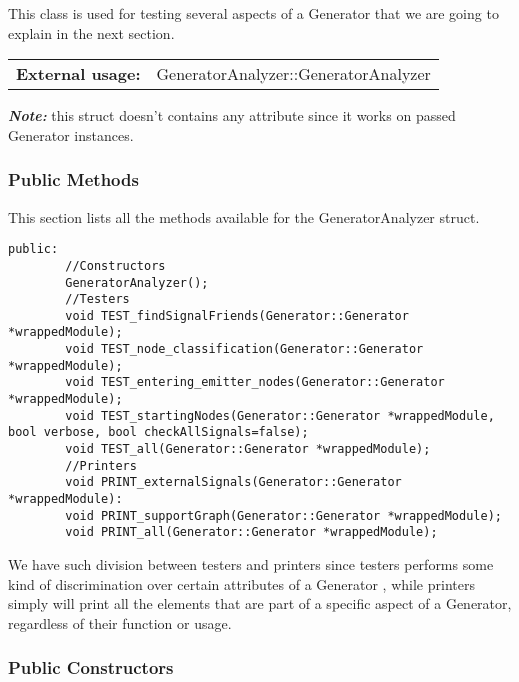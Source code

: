 \documentclass{article}
\begin{document}
This class is used for testing several aspects of a Generator that we are going to explain in the next section.\\

\begin{tabular}{ll}
	\textbf{External usage: } & GeneratorAnalyzer::GeneratorAnalyzer\\
\end{tabular}

\textbf{\textit{Note: }} this struct doesn't contains any attribute since it works on passed Generator instances.\\

\subsubsection{Public Methods}

This section lists all the methods available for the GeneratorAnalyzer struct.\\

\begin{mdframed}[hidealllines=true, backgroundcolor=magenta!10]
	\begin{lstlisting}[basicstyle=\tiny]
	public:
		//Constructors
		GeneratorAnalyzer();
		//Testers
		void TEST_findSignalFriends(Generator::Generator *wrappedModule);
		void TEST_node_classification(Generator::Generator *wrappedModule);
		void TEST_entering_emitter_nodes(Generator::Generator *wrappedModule);
		void TEST_startingNodes(Generator::Generator *wrappedModule, bool verbose, bool checkAllSignals=false);
		void TEST_all(Generator::Generator *wrappedModule);
		//Printers
		void PRINT_externalSignals(Generator::Generator *wrappedModule):
		void PRINT_supportGraph(Generator::Generator *wrappedModule);
		void PRINT_all(Generator::Generator *wrappedModule);
	\end{lstlisting}
\end{mdframed}

We have such division between testers and printers since testers performs some kind of discrimination over certain attributes of a Generator , while printers simply will print all the elements that are part of a specific aspect of a Generator, regardless of their function or usage.\\

\subsubsection{Public Constructors}
\end{document}
